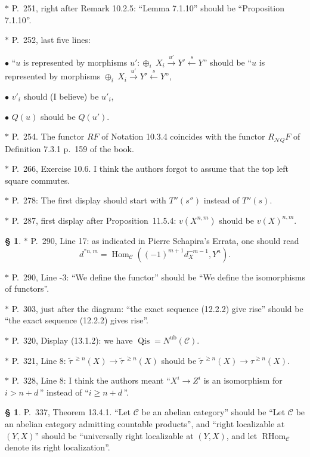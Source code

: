\documentclass[12pt]{article}
\theoremstyle{remark}
\theoremstyle{definition}
\newtheorem{s}[thm]{\S}
\newcommand{\bu}{\bullet}
\newcommand{\nn}{\noindent}
\newcommand{\cc}{\mathcal}
\newcommand{\oo}{\operatorname}
\newcommand{\C}{\mathcal C}
\newcommand{\xr}{\xrightarrow}
\DeclareMathOperator{\Hom}{Hom}
\begin{document}
\nn$*$ P.~251, right after Remark 10.2.5: ``Lemma 7.1.10'' should be ``Proposition 7.1.10''.

\nn$*$ P.~252, last five lines:

$\bu$ ``$u$ is represented by morphisms $u':\oplus_i\ X_i\xr{u'}Y'\xleftarrow sY$'' should be ``$u$ is represented by morphisms $\oplus_i\ X_i\xr{u'}Y'\xleftarrow sY$'',

$\bu$ $v'_i$ should (I believe) be $u'_i$,

$\bu$ $Q(u)$ should be $Q(u')$.

\nn$*$ P.~254. The functor $RF$ of Notation 10.3.4 coincides with the functor $R_{\cc NQ}F$ of Definition 7.3.1 p.~159 of the book.

\nn$*$ P.~266, Exercise 10.6. I think the authors forgot to assume that the top left square commutes.

\nn$*$ P.~278: The first display should start with $T''(s'')$ instead of $T''(s)$.

\nn$*$ P.~287, first display after Proposition~11.5.4: $v(X^{n,m})$ should be $v(X)^{n,m}$.

\begin{s}\label{290}
\nn$*$ P.~290, Line 17: as indicated in Pierre Schapira's Errata, one should read 
$$
d^{''n,m}=\Hom_\C((-1)^{m+1}d_X^{-m-1},Y^n).
$$
\end{s}

\nn$*$ P.~290, Line -3: ``We define the functor'' should be ``We define the isomorphisms of functors''.

\nn$*$ P.~303, just after the diagram: ``the exact sequence (12.2.2) give rise'' should be ``the exact sequence (12.2.2) gives rise''.

\nn$*$ P.~320, Display (13.1.2): we have $\oo{Qis}=N^{\oo{ub}}(\C)$.

\nn$*$ P.~321, Line 8: $\widetilde\tau\,{}^{\ge n}(X)\to\widetilde\tau\,{}^{\ge n}(X)$ should be $\widetilde\tau\,{}^{\ge n}(X)\to\tau^{\ge n}(X)$.

\nn$*$ P.~328, Line 8: I think the authors meant ``$X^i\to Z^i$ is an isomorphism for $i>n+d\,$'' instead of ``$i\ge n+d\,$''.

\begin{s}\label{1341}
P.~337, Theorem 13.4.1. ``Let $\C$ be an abelian category'' should be ``Let $\C$ be an abelian category admitting countable products'', and ``right localizable at $(Y,X)$'' should be ``universally right localizable at $(Y,X)$, and let $\oo{RHom}_\C$ denote its right localization''.
\end{s}
\end{document}

